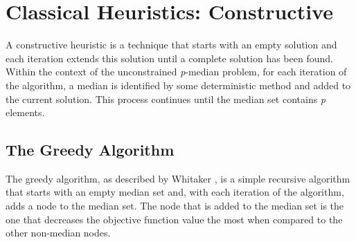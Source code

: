 \documentclass[11pt]{article}
\begin{document}
	\section{Classical Heuristics: Constructive} \label{classicheuristics.constructive}
	A constructive heuristic is a technique that starts with an empty solution and each iteration extends this solution until a complete solution has been found.  Within the context of the unconstrained \emph{p}-median problem, for each iteration of the algorithm, a median is identified by some deterministic method and added to the current solution.  This process continues until the median set contains \emph{p} elements.
	
	\subsection{The Greedy Algorithm}\label{greedyalgo}
	The greedy algorithm, as described by Whitaker \cite{WHIT83},  is a simple recursive algorithm that starts with an empty median set and, with each iteration of the algorithm, adds a node to the median set.  The node that is added to the median set is the one that decreases the objective function value the most when compared to the other non-median nodes.
	
\end{document}
